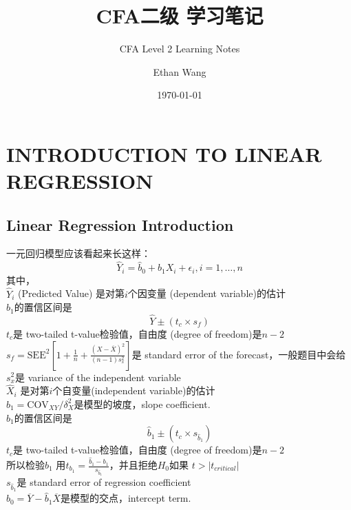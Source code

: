 \documentclass[cn,11pt,chinese]{elegantbook}
\title{CFA二级 学习笔记}
\subtitle{CFA Level 2 Learning Notes}
\author{Ethan Wang}
\institute{纽约大学}
\date{\today}
\begin{document}
\maketitle
\frontmatter

\tableofcontents

\mainmatter 
\chapter{INTRODUCTION TO LINEAR REGRESSION}

\section{Linear Regression Introduction}
    一元回归模型应该看起来长这样：
    \begin{equation}
        \hat Y_i = \hat b_0 + \hat b_1 X_i + \epsilon_i, i = 1,\dots, n
    \end{equation}
    其中，\\
    \indent \(\hat Y_i\) (Predicted Value) 是对第\(i\)个因变量 (dependent variable)的估计\\
    \indent \indent \(\hat b_1\)的置信区间是
        \[\hat Y \pm (t_c \times s_f)\]
    \indent \indent \indent \(t_c\)是 two-tailed t-value检验值，自由度 (degree of freedom)是\(n - 2\)\\ 
    \indent \indent \indent \(s_f = \text{SEE}^2 [1 + \frac{1}{n} + \frac{(X - \overline{X})^2}{(n - 1)s_x^2}]\)是 standard error of the forecast，一般题目中会给\\ 
    \indent \indent \indent \indent \(s_x^2\)是 variance of the independent variable\\
    \indent \(\hat X_i\) 是对第\(i\)个自变量(independent variable)的估计\\
    \indent \(\hat b_1 = \text{COV}_{XY} / \delta_X^2\)是模型的坡度，slope coefficient.\\
    \indent \indent \(\hat b_1\)的置信区间是
        \[ \hat b_1 \pm (t_c \times s_{\hat b_1}) \] 
    \indent \indent \indent \(t_c\)是 two-tailed t-value检验值，自由度 (degree of freedom)是\(n - 2\)\\ 
    \indent \indent \indent \indent 所以检验\(\hat b_1\) 用\(t_{b_1} = \frac{\hat b_1 - b_1}{s_{\hat b_1}}\)，并且拒绝\(H_0\)如果 \(t > |t_{critical}|\)\\ 
    \indent \indent \indent \(s_{\hat b_1}\)是 standard error of regression coefficient\\
    \indent \(\hat b_0 = \overline{Y} - \hat b_1 \overline{X}\)是模型的交点，intercept term.
\end{document}
